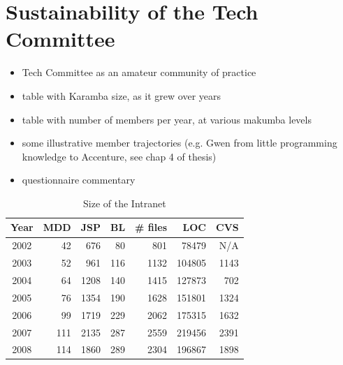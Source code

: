 \documentclass{acm_proc_article-sp}
\begin{document}
\section{Sustainability of the Tech Committee}\label{sec:techCommittee}
\begin{itemize}
\item Tech Committee as an amateur community of practice
\item table with Karamba size, as it grew over years
\item table with number of members per year, at various makumba levels
\item some illustrative member trajectories (e.g. Gwen from little programming knowledge to Accenture, see chap 4 of thesis)
\item questionnaire commentary
\end{itemize}

\begin{table}
	\centering
	\label{tab:intranet-size}
	\caption{Size of the Intranet}
	\begin{tabular}{c|r|r|r|r|r|r}
		\hline
		\hline
		Year	& MDD	& JSP	& BL	& \# files	& LOC		& CVS	 \\
		\hline
		\hline
		2002 	& 42	& 676	& 80	& 801		& 78479 	& N/A	 \\ 
		\hline
		2003 	& 52	& 961	& 116	& 1132		& 104805 	& 1143	 \\ 
		\hline
		2004 	& 64	& 1208	& 140	& 1415		& 127873 	& 702	 \\ 
		\hline
		2005 	& 76	& 1354	& 190	& 1628		& 151801 	& 1324	 \\ 
		\hline
		2006 	& 99	& 1719	& 229	& 2062		& 175315 	& 1632	 \\ 
		\hline
		2007 	& 111	& 2135	& 287	& 2559		& 219456 	& 2391	 \\ 
		\hline
		2008 	& 114	& 1860	& 289	& 2304		& 196867 	& 1898	 \\ 
		\hline
		
		\hline
		\hline
	\end{tabular}
\end{table} 
\end{document}
